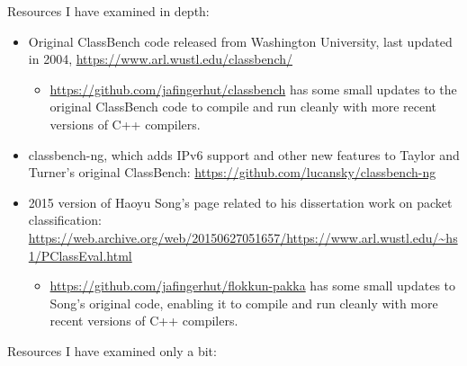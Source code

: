 \documentclass[acmsmall]{acmart}
\begin{document}
Resources I have examined in depth:

\begin{itemize}
\item Original ClassBench code released from Washington University,
  last updated in 2004, \url{https://www.arl.wustl.edu/classbench/}
  \begin{itemize}
  \item \url{https://github.com/jafingerhut/classbench} has some
    small updates to the original ClassBench code to compile and
    run cleanly with more recent versions of C++ compilers.
  \end{itemize}
\item classbench-ng, which adds IPv6 support and other new features
  to Taylor and Turner's original ClassBench:
  \url{https://github.com/lucansky/classbench-ng}
\item 2015 version of Haoyu Song's page
  related to his dissertation work on packet classification:
  \url{https://web.archive.org/web/20150627051657/https://www.arl.wustl.edu/~hs1/PClassEval.html}
  \begin{itemize}
  \item \url{https://github.com/jafingerhut/flokkun-pakka} has some
    small updates to Song's original code, enabling it to compile and
    run cleanly with more recent versions of C++ compilers.
  \end{itemize}
\end{itemize}

Resources I have examined only a bit:
\end{document}
